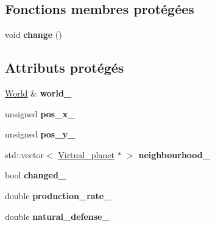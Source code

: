 \subsection*{Fonctions membres protégées}
\begin{DoxyCompactItemize}
\item 
\hypertarget{classVirtual__planet_a9c79d42a13bb25243354faf9895aca14}{void {\bfseries change} ()}\label{classVirtual__planet_a9c79d42a13bb25243354faf9895aca14}

\end{DoxyCompactItemize}
\subsection*{Attributs protégés}
\begin{DoxyCompactItemize}
\item 
\hypertarget{classVirtual__planet_a16ff82fac346eec9d2229fb8c09e3807}{\hyperlink{classWorld}{World} \& {\bfseries world\-\_\-}}\label{classVirtual__planet_a16ff82fac346eec9d2229fb8c09e3807}

\item 
\hypertarget{classVirtual__planet_ad03593bd1a1236933b638f6079f639b1}{unsigned {\bfseries pos\-\_\-x\-\_\-}}\label{classVirtual__planet_ad03593bd1a1236933b638f6079f639b1}

\item 
\hypertarget{classVirtual__planet_aa7e03c8010b64d2528d5edb5651962a9}{unsigned {\bfseries pos\-\_\-y\-\_\-}}\label{classVirtual__planet_aa7e03c8010b64d2528d5edb5651962a9}

\item 
\hypertarget{classVirtual__planet_a353b64093f5c146de64a2f694738b65b}{std\-::vector$<$ \hyperlink{classVirtual__planet}{Virtual\-\_\-planet} $\ast$ $>$ {\bfseries neighbourhood\-\_\-}}\label{classVirtual__planet_a353b64093f5c146de64a2f694738b65b}

\item 
\hypertarget{classVirtual__planet_aa5ebb40e5a4ed0a631b120749f938f35}{bool {\bfseries changed\-\_\-}}\label{classVirtual__planet_aa5ebb40e5a4ed0a631b120749f938f35}

\item 
\hypertarget{classVirtual__planet_a6f8de6a5104185b9c36c64a45260fab6}{double {\bfseries production\-\_\-rate\-\_\-}}\label{classVirtual__planet_a6f8de6a5104185b9c36c64a45260fab6}

\item 
\hypertarget{classVirtual__planet_af62ede97e609fd17818af229799dbe3b}{double {\bfseries natural\-\_\-defense\-\_\-}}\label{classVirtual__planet_af62ede97e609fd17818af229799dbe3b}

\end{DoxyCompactItemize}
